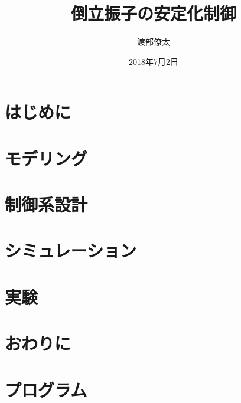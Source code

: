 \documentclass[a4j , 11pt , twoside]{jbook}
\begin{document}
\title{倒立振子の安定化制御}
\author{渡部僚太}
\date{2018年7月2日}
\maketitle
\tableofcontents %
\listoffigures %
\listoftables %
\cleardoublepage %
\chapter{はじめに}
	
\chapter{モデリング}
	
\chapter{制御系設計}  
	 
\chapter{シミュレーション}
	
\chapter{実験}
	
\chapter{おわりに}
	



\appendix
\chapter{プログラム}
	
\end{document}
